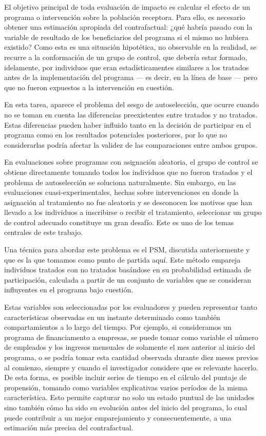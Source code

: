 \documentclass[../main.tex]{subfiles}
\begin{document}
El objetivo principal de toda evaluación de impacto es calcular el efecto de un programa o
intervención sobre la población receptora. Para ello, es necesario obtener una estimación
apropiada del contrafactual: ¿qué habría pasado con la variable de resultado de los
beneficiarios del programa si el mismo no hubiera existido? Como esta es una situación
hipotética, no observable en la realidad, se recurre a la conformación de un grupo de
control, que debería estar formado, idelamente, por individuos que eran estadísticamentes
similares a los tratados antes de la implementación del programa — es decir, en la línea
de base — pero que no fueron expuestos a la intervención en cuestión.

En esta tarea, aparece el problema del sesgo de autoselección, que ocurre cuando no se
toman en cuenta las diferencias preexistentes entre tratados y no tratados. Estas
diferencias pueden haber influido tanto en la decisión de participar en el programa como
en los resultados potenciales posteriores, por lo que no considerarlas podría afectar la
validez de las comparaciones entre ambos grupos.

En evaluaciones sobre programas con asignación aleatoria, el grupo de control se obtiene
directamente tomando todos los individuos que no fueron tratados y el problema de
autoselección se soluciona naturalmente. Sin embargo, en las evaluaciones
cuasi-experimentales, hechas sobre intervenciones en donde la asignación al tratamiento no
fue aleatoria y se desconocen los motivos que han llevado a los individuos a inscribirse o
recibir el tratamiento, seleccionar un grupo de control adecuado constituye un gran
desafío. Este es uno de los temas centrales de este trabajo.

Una técnica para abordar este problema es el PSM, discutida anteriormente y que es la que
tomamos como punto de partida aquí. Este método empareja individuos tratados con no
tratados basándose en su probabilidad estimada de participación, calculada a partir de un
conjunto de variables que se consideran influyentes en el programa bajo cuestión.

Estas variables son seleccionadas por los evaluadores y pueden representar tanto
características observadas en un instante determinado como también compartamientos a lo
largo del tiempo. Por ejemplo, si consideramos un programa de financiamento a empresas, se
puede tomar como variable el número de empleados y los ingresos mensuales de solamente el
mes anterior al inicio del programa, o se podría tomar esta cantidad observada durante
diez meses previos al comienzo, siempre y cuando el investigador considere que es
relevante hacerlo. De esta forma, es posible incluir series de tiempo en el cálculo del
puntaje de propensión, tomando como variables explicativas varios períodos de la misma
característica. Esto permite capturar no solo un estado puntual de las unidades sino
también cómo ha sido su evolución antes del inicio del programa, lo cual puede contribuir
a un mejor emparejamiento y consecuentemente, a una estimación más precisa del
contrafactual.
\end{document}
